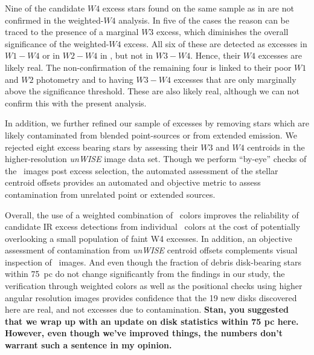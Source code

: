     Nine %
    of the candidate $W4$ excess stars found on the same sample as in  are not confirmed in the weighted-$W4$ analysis.  In five %
    of the cases the reason can be traced to the presence of a marginal $W3$ excess, which diminishes the overall significance of the weighted-$W4$ excess.  All six of these are detected as excesses in $W1-W4$ or in $W2-W4$ in , but not in $W3-W4$.  Hence, their $W4$ excesses are likely real.  The non-confirmation of the remaining four is linked to their poor $W1$ and $W2$ photometry and to having $W3-W4$ excesses that are only marginally above the significance threshold.  These are also likely real, although we can not confirm this with the present analysis.

    In addition, we further refined our sample of excesses by removing stars which are likely contaminated from blended point-sources or from extended emission. We rejected eight excess bearing stars by assessing their $W3$ and $W4$ centroids in the higher-resolution \textit{unWISE} image data set. Though we perform ``by-eye'' checks of the \WSAC\ images post excess selection, the automated assessment of the stellar centroid offsets provides an automated and objective metric to assess contamination from unrelated point or extended sources. 

    Overall, the use of a weighted combination of \WS\ colors improves the reliability of candidate IR excess detections from individual \WS\ colors at the cost of potentially overlooking a small population of faint W4 excesses. In addition, an objective assessment of contamination from \textit{unWISE} centroid offsets complements visual inspection of \WS\ images. And even though the fraction of debris disk-bearing stars within 75~pc do not change significantly from the findings in our study, the verification through weighted colors as well as the positional checks using higher angular resolution images provides confidence that the 19 new disks discovered here are real, and not excesses due to contamination. \textbf{Stan, you suggested that we wrap up with an update on disk statistics within 75 pc here. However, even though we've improved things, the numbers don't warrant such a sentence in my opinion.}

